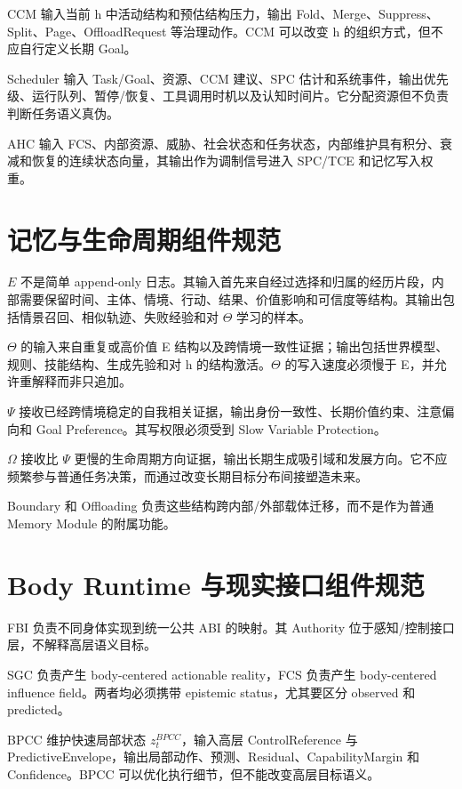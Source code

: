 CCM 输入当前 h 中活动结构和预估结构压力，输出 Fold、Merge、Suppress、Split、Page、OffloadRequest 等治理动作。CCM 可以改变 h 的组织方式，但不应自行定义长期 Goal。

Scheduler 输入 Task/Goal、资源、CCM 建议、SPC 估计和系统事件，输出优先级、运行队列、暂停/恢复、工具调用时机以及认知时间片。它分配资源但不负责判断任务语义真伪。

AHC 输入 FCS、内部资源、威胁、社会状态和任务状态，内部维护具有积分、衰减和恢复的连续状态向量，其输出作为调制信号进入 SPC/TCE 和记忆写入权重。

\section{记忆与生命周期组件规范}

$E$ 不是简单 append-only 日志。其输入首先来自经过选择和归属的经历片段，内部需要保留时间、主体、情境、行动、结果、价值影响和可信度等结构。其输出包括情景召回、相似轨迹、失败经验和对 $\Theta$ 学习的样本。

$\Theta$ 的输入来自重复或高价值 E 结构以及跨情境一致性证据；输出包括世界模型、规则、技能结构、生成先验和对 h 的结构激活。$\Theta$ 的写入速度必须慢于 E，并允许重解释而非只追加。

$\Psi$ 接收已经跨情境稳定的自我相关证据，输出身份一致性、长期价值约束、注意偏向和 Goal Preference。其写权限必须受到 Slow Variable Protection。

$\Omega$ 接收比 $\Psi$ 更慢的生命周期方向证据，输出长期生成吸引域和发展方向。它不应频繁参与普通任务决策，而通过改变长期目标分布间接塑造未来。

Boundary 和 Offloading 负责这些结构跨内部/外部载体迁移，而不是作为普通 Memory Module 的附属功能。

\section{Body Runtime 与现实接口组件规范}

FBI 负责不同身体实现到统一公共 ABI 的映射。其 Authority 位于感知/控制接口层，不解释高层语义目标。

SGC 负责产生 body-centered actionable reality，FCS 负责产生 body-centered influence field。两者均必须携带 epistemic status，尤其要区分 observed 和 predicted。

BPCC 维护快速局部状态 $z_t^{BPCC}$，输入高层 ControlReference 与 PredictiveEnvelope，输出局部动作、预测、Residual、CapabilityMargin 和 Confidence。BPCC 可以优化执行细节，但不能改变高层目标语义。

